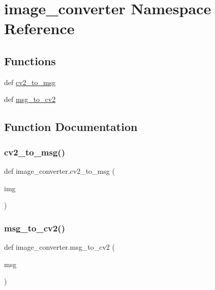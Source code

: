 \hypertarget{namespaceimage__converter}{}\section{image\+\_\+converter Namespace Reference}
\label{namespaceimage__converter}
\subsection*{Functions}
\begin{DoxyCompactItemize}
\item 
def \hyperlink{namespaceimage__converter_a0524d20e529f4fa1b0a035bd10157244}{cv2\+\_\+to\+\_\+msg}
\item 
def \hyperlink{namespaceimage__converter_a530a44b8fc868bfea542962e9e1b1ff5}{msg\+\_\+to\+\_\+cv2}
\end{DoxyCompactItemize}


\subsection{Function Documentation}
\mbox{\label{namespaceimage__converter_a0524d20e529f4fa1b0a035bd10157244}} 
\subsubsection{\texorpdfstring{cv2\+\_\+to\+\_\+msg()}{cv2\_to\_msg()}}
{\footnotesize\ttfamily def image\+\_\+converter.\+cv2\+\_\+to\+\_\+msg (\begin{DoxyParamCaption}\item[{}]{img }\end{DoxyParamCaption})}

\mbox{\label{namespaceimage__converter_a530a44b8fc868bfea542962e9e1b1ff5}} 
\subsubsection{\texorpdfstring{msg\+\_\+to\+\_\+cv2()}{msg\_to\_cv2()}}
{\footnotesize\ttfamily def image\+\_\+converter.\+msg\+\_\+to\+\_\+cv2 (\begin{DoxyParamCaption}\item[{}]{msg }\end{DoxyParamCaption})}

